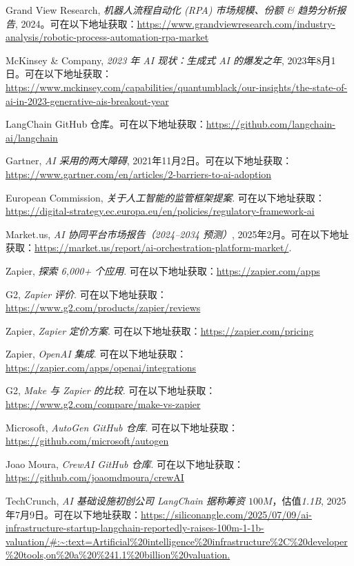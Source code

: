 \documentclass[11pt, a4paper, oneside]{article}
\begin{document}
\begin{thebibliography}{99}
    Grand View Research, \textit{机器人流程自动化 (RPA) 市场规模、份额 \& 趋势分析报告}, 2024。可在以下地址获取：\url{https://www.grandviewresearch.com/industry-analysis/robotic-process-automation-rpa-market}

    McKinsey \& Company, \textit{2023 年 AI 现状：生成式 AI 的爆发之年}, 2023年8月1日。可在以下地址获取：\url{https://www.mckinsey.com/capabilities/quantumblack/our-insights/the-state-of-ai-in-2023-generative-ais-breakout-year}


    LangChain GitHub 仓库。可在以下地址获取：\url{https://github.com/langchain-ai/langchain}

    Gartner, \textit{AI 采用的两大障碍}, 2021年11月2日。可在以下地址获取：\url{https://www.gartner.com/en/articles/2-barriers-to-ai-adoption}

    European Commission, \textit{关于人工智能的监管框架提案}. 可在以下地址获取：\url{https://digital-strategy.ec.europa.eu/en/policies/regulatory-framework-ai}
    
    Market.us, \textit{AI 协同平台市场报告（2024--2034 预测）}, 2025年2月。可在以下地址获取：\url{https://market.us/report/ai-orchestration-platform-market/}.

    Zapier, \textit{探索 6,000+ 个应用}. 可在以下地址获取：\url{https://zapier.com/apps}

    G2, \textit{Zapier 评价}. 可在以下地址获取：\url{https://www.g2.com/products/zapier/reviews}

    Zapier, \textit{Zapier 定价方案}. 可在以下地址获取：\url{https://zapier.com/pricing}


    Zapier, \textit{OpenAI 集成}. 可在以下地址获取：\url{https://zapier.com/apps/openai/integrations}

    G2, \textit{Make 与 Zapier 的比较}. 可在以下地址获取：\url{https://www.g2.com/compare/make-vs-zapier}


    Microsoft, \textit{AutoGen GitHub 仓库}. 可在以下地址获取：\url{https://github.com/microsoft/autogen}

    Joao Moura, \textit{CrewAI GitHub 仓库}. 可在以下地址获取：\url{https://github.com/joaomdmoura/crewAI}

    TechCrunch, \textit{AI 基础设施初创公司 LangChain 据称筹资 $100M，估值 $1.1B}, 2025年7月9日。可在以下地址获取：\url{https://siliconangle.com/2025/07/09/ai-infrastructure-startup-langchain-reportedly-raises-100m-1-1b-valuation/#:~:text=Artificial%20intelligence%20infrastructure%2C%20developer%20tools,on%20a%20%241.1%20billion%20valuation.}


\end{thebibliography}
\end{document}
